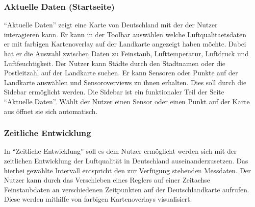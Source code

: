 \subsubsection{Aktuelle Daten (Startseite)}

\enquote{Aktuelle Daten} zeigt eine Karte von Deutschland mit der der Nutzer interagieren kann. 
Er kann in der \gls{Toolbar} auswählen welche \gls{Luftqualitaetsdaten} er mit farbigen \gls{Kartenoverlay} auf der Landkarte angezeigt haben möchte. 
Dabei hat er die Auswahl zwischen Daten zu \gls{Feinstaub}, Lufttemperatur, Luftdruck und Luftfeuchtigkeit.
Der Nutzer kann Städte durch den Stadtnamen oder die Postleitzahl auf der Landkarte suchen. Er kann Sensoren oder Punkte auf der Landkarte auswählen und \glspl{Sensoroverview} zu ihnen erhalten. Dies soll durch die \gls{Sidebar} ermöglicht werden.
Die \gls{Sidebar} ist ein funktionaler Teil der Seite \enquote{Aktuelle Daten}. Wählt der Nutzer einen \gls{Sensor} oder einen Punkt auf der Karte aus öffnet sie sich automatisch.



\subsubsection{Zeitliche Entwicklung}

In \enquote{Zeitliche Entwicklung} soll es dem Nutzer ermöglicht werden sich mit der zeitlichen Entwicklung der Luftqualität in Deutschland auseinanderzusetzen. Das hierbei gewählte Intervall entspricht den zur Verfügung stehenden Messdaten.
Der Nutzer kann durch das Verschieben eines Reglers auf einer Zeitachse \gls{Feinstaub}daten an verschiedenen Zeitpunkten auf der Deutschlandkarte aufrufen. Diese werden mithilfe von farbigen \glspl{Kartenoverlay} visualisiert.
\\
\\

